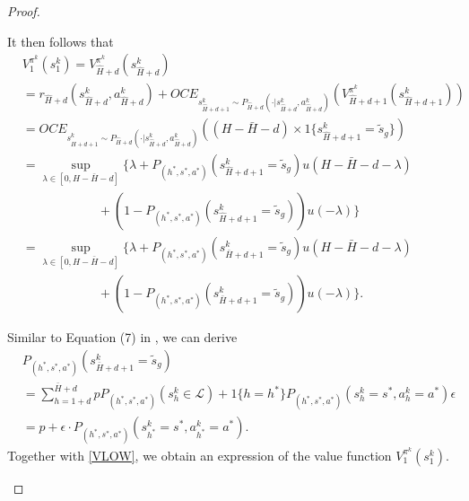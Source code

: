 \documentclass[11pt]{article}
\newcommand{\1}{\mathbbm{1}}
\begin{document}
\begin{proof}
\begin{itemize}



It then follows that 
\begin{equation}\label{VLOW}
\begin{aligned}
&V_1^{\pi^k}(s_1^k) = V_{\hat{H}+d}^{\pi^k}(s_{\hat{H}+d}^k)\\
&=r_{\hat{H}+d}(s_{\hat{H}+d}^k,a_{\hat{H}+d}^k)+OCE_{s_{\hat{H}+d+1}^k\sim P_{\hat{H}+d}(\cdot\vert s_{\hat{H}+d}^k,a_{\hat{H}+d}^k)}(V_{\hat{H}+d+1}^{\pi^k}(s_{\hat{H}+d+1}^k))\\
&=OCE_{s_{\hat{H}+d+1}^k\sim P_{\hat{H}+d} (\cdot\vert s_{\hat{H}+d}^k,a_{\hat{H}+d}^k)}\left((H-\bar{H}-d)\times 1\{s^k_{\hat{H}+d+1}=\tilde{s}_g\}\right )\\
&=\sup_{\lambda\in [0,H-\bar{H}-d]}\{\lambda+P_{(h^*,s^*,a^*)}(s^k_{\hat{H}+d+1}=\tilde{s}_g)u(H-\bar{H}-d-\lambda)\\
&\quad \quad \quad \quad \quad \quad +(1-P_{(h^*,s^*,a^*)}(s^k_{\hat{H}+d+1}=\tilde{s}_g))u(-\lambda)\}\\
&=\sup_{\lambda\in [0,H-\bar{H}-d]}\{\lambda+P_{(h^*,s^*,a^*)}(s^k_{\bar{H}+d+1}=\tilde{s}_g)u(H-\bar{H}-d-\lambda)\\
&\quad \quad \quad \quad \quad \quad +(1-P_{(h^*,s^*,a^*)}(s^k_{\bar{H}+d+1}=\tilde{s}_g))u(-\lambda)\}.
\end{aligned}    
\end{equation}


Similar to Equation (7) in \cite{domingues2021episodic}, we can derive
\begin{equation}\label{S26}
\begin{aligned}
&P_{(h^*,s^*,a^*)}(s^k_{\bar{H}+d+1}=\tilde{s}_g)\\
&= \sum_{h=1+d}^{\bar{H}+d}pP_{(h^*,s^*,a^*)}(s^k_{h}\in\mathcal{L})+1\{h=h^*\}P_{(h^*,s^*,a^*)}(s_h^k=s^*,a_h^k=a^*)\epsilon\\
&= p+\epsilon \cdot P_{(h^*,s^*,a^*)}(s_{h^*}^k=s^*,a_{h^*}^k=a^*).
\end{aligned}
\end{equation}
Together with \eqref{VLOW}, we obtain an expression of the value function $V_1^{\pi^k}(s_1^k)$.




\end{itemize}
\end{proof}
\end{document}
